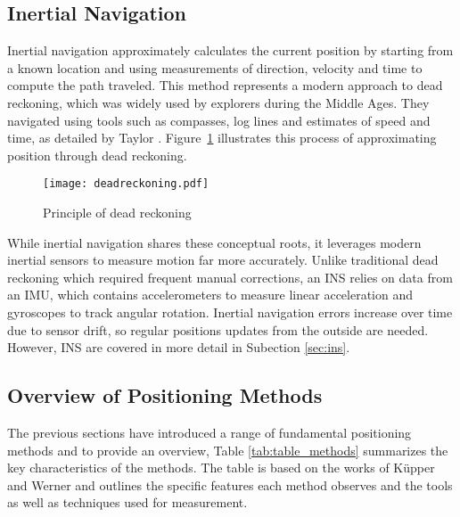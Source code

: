 \subsection{Inertial Navigation}
\label{sec:inertial}
Inertial navigation approximately calculates the current position by starting from a known location and using measurements of direction, velocity and time to compute the path traveled.
This method represents a modern approach to dead reckoning, which was widely used by explorers during the Middle Ages. 
They navigated using tools such as compasses, log lines and estimates of speed and time, as detailed by Taylor \cite{taylor1950deadreckoning}. 
Figure~\ref{fig:deadreckoning} illustrates this process of approximating position through dead reckoning.

\begin{figure}[htbp] 
    \centering \texttt{[image: deadreckoning.pdf]} 
    \caption{Principle of dead reckoning \cite{wei2022positioning}} 
    \label{fig:deadreckoning} 
\end{figure}

While inertial navigation shares these conceptual roots, it leverages modern inertial sensors to measure motion far more accurately. 
Unlike traditional dead reckoning which required frequent manual corrections, an \ac{INS} relies on data from an \ac{IMU}, which contains accelerometers to measure linear acceleration and gyroscopes to track angular rotation.
Inertial navigation errors increase over time due to sensor drift, so regular positions updates from the outside are needed.
However, \acs{INS} are covered in more detail in Subection \ref{sec:ins}.

\subsection{Overview of Positioning Methods}
The previous sections have introduced a range of fundamental positioning methods and to provide an overview, Table \ref{tab:table_methods} summarizes the key characteristics of the methods. 
The table is based on the works of K\"upper \cite{kupper2005location} and Werner \cite{werner2014indoor} and outlines the specific features each method observes and the tools as well as techniques used for measurement.

